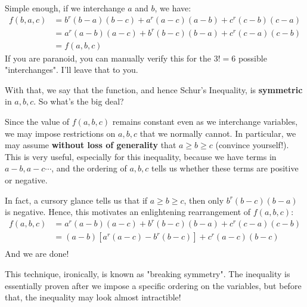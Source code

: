 \documentclass[../jarvis.tex]{subfiles}
\begin{document}
Simple enough, if we interchange $a$ and $b$, we have:
\begin{align*}
    f(b,a,c)&=b^r(b-a)(b-c)+a^r(a-c)(a-b)+c^r(c-b)(c-a) \\
    &=a^r(a-b)(a-c)+b^r(b-c)(b-a)+c^r(c-a)(c-b) \\
    &=f(a,b,c)
\end{align*}
If you are paranoid, you can manually verify this for the $3!=6$ possible "interchanges". I'll leave that to you.

With that, we say that the function, and hence Schur's Inequality, is \textbf{symmetric} in $a,b,c$. So what's the big deal?

Since the value of $f(a,b,c)$ remains constant even as we interchange variables, we may impose restrictions on $a,b,c$ that we normally cannot. In particular, we may assume \textbf{without loss of generality} that $a\geq b\geq c$ (convince yourself!). This is very useful, especially for this inequality, because we have terms in $a-b, a-c \cdots$, and the ordering of $a,b,c$ tells us whether these terms are positive or negative.

In fact, a cursory glance tells us that if $a\geq b \geq c$, then only $b^r(b-c)(b-a)$ is negative. Hence, this motivates an enlightening rearrangement of $f(a,b,c)$:
\begin{align*}
    f(a,b,c)&= a^r(a-b)(a-c)+b^r(b-c)(b-a)+c^r(c-a)(c-b)\\
            &= (a-b)[a^r(a-c)-b^r(b-c)]+c^r(a-c)(b-c) \\
\end{align*}
And we are done!
\begin{moral}
This technique, ironically, is known as "breaking symmetry". The inequality is essentially proven after we impose a specific ordering on the variables, but before that, the inequality may look almost intractible!
\end{moral}
\end{document}

